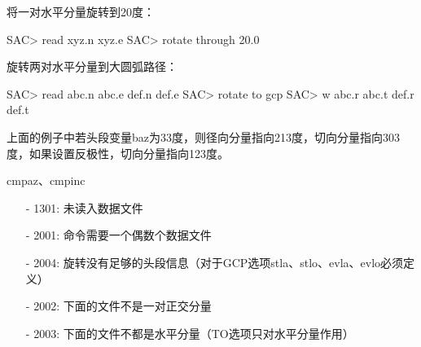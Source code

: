 将一对水平分量旋转到20度：
\begin{SACCode}
SAC> read xyz.n xyz.e
SAC> rotate through 20.0
\end{SACCode}

旋转两对水平分量到大圆弧路径：
\begin{SACCode}
SAC> read abc.n abc.e def.n def.e
SAC> rotate to gcp
SAC> w abc.r abc.t def.r def.t
\end{SACCode}
上面的例子中若头段变量baz为33度，则径向分量指向213度，切向分量指向303度，如果设置反极性，切向分量指向123度。

cmpaz、cmpinc

\begin{itemize}
\item[-]1301: 未读入数据文件
\item[-]2001: 命令需要一个偶数个数据文件
\item[-]2004: 旋转没有足够的头段信息（对于GCP选项stla、stlo、evla、evlo必须定义）
\item[-]2002: 下面的文件不是一对正交分量
\item[-]2003: 下面的文件不都是水平分量（TO选项只对水平分量作用）
\end{itemize}